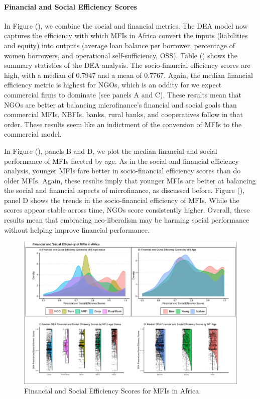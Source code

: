 \documentclass[
]{article}
\begin{document}
\hypertarget{financial-and-social-efficiency-scores}{%
\paragraph{Financial and Social Efficiency
Scores}\label{financial-and-social-efficiency-scores}}

In Figure (), we combine the social and financial metrics. The DEA model
now captures the efficiency with which MFIs in Africa convert the inputs
(liabilities and equity) into outputs (average loan balance per
borrower, percentage of women borrowers, and operational
self-sufficiency, OSS). Table () shows the summary statistics of the DEA
analysis. The socio-financial efficiency scores are high, with a median
of 0.7947 and a mean of 0.7767. Again, the median financial efficiency
metric is highest for NGOs, which is an oddity for we expect commercial
firms to dominate (see panels A and C). These results mean that NGOs are
better at balancing microfinance's financial and social goals than
commercial MFIs. NBFIs, banks, rural banks, and cooperatives follow in
that order. These results seem like an indictment of the conversion of
MFIs to the commercial model.

In Figure (), panels B and D, we plot the median financial and social
performance of MFIs faceted by age. As in the social and financial
efficiency analysis, younger MFIs fare better in socio-financial
efficiency scores than do older MFIs. Again, these results imply that
younger MFIs are better at balancing the social and financial aspects of
microfinance, as discussed before. Figure (), panel D shows the trends
in the socio-financial efficiency of MFIs. While the scores appear
stable across time, NGOs score consistently higher. Overall, these
results mean that embracing neo-liberalism may be harming social
performance without helping improve financial performance.

\begin{landscape}

\newpage

\begin{figure}
\centering
\includegraphics{finsoc_efficiency_files/figure-latex/unnamed-chunk-23-1.pdf}
\caption{Financial and Social Efficiency Scores for MFIs in Africa}
\end{figure}

\end{landscape}
\end{document}

